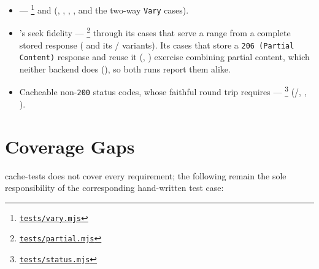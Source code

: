\begin{itemize}
          and  (,
          ).
    \item {} ---
          \footnote{\href{https://github.com/http-tests/cache-tests/blob/b55b8bda3dbb8c927c04e85bd8d496a8caa3e4ba/tests/vary.mjs}{\texttt{tests/vary.mjs}}}
          and  (,
          , ,
          , and the two-way \texttt{Vary} cases).
    \item {}'s seek fidelity ---
          \footnote{\href{https://github.com/http-tests/cache-tests/blob/b55b8bda3dbb8c927c04e85bd8d496a8caa3e4ba/tests/partial.mjs}{\texttt{tests/partial.mjs}}}
          through its cases that serve a range from a complete stored
          response ( and its
          / variants). Its cases that store a
          \texttt{206 (Partial Content)} response and reuse it
          (,
          ) exercise combining partial
          content, which neither backend does
          (), so both runs report them
          alike.
    \item Cacheable non-\texttt{200} status codes, whose faithful round trip
           requires ---
          \footnote{\href{https://github.com/http-tests/cache-tests/blob/b55b8bda3dbb8c927c04e85bd8d496a8caa3e4ba/tests/status.mjs}{\texttt{tests/status.mjs}}}
          (/,
          ,
          ).
\end{itemize}

\section{Coverage Gaps}

cache-tests does not cover every  requirement; the
following remain the sole responsibility of the corresponding hand-written
 test case:

